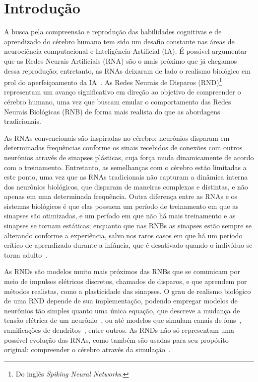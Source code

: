 \chapter{Introdução}

A busca pela compreensão e reprodução das habilidades cognitivas e de aprendizado do cérebro humano tem sido um desafio constante
nas áreas de neurociência computacional e Inteligência Artificial (IA). É possível argumentar que as Redes Neurais Artificiais
(RNA) são o mais próximo que já chegamos dessa reprodução; entretanto, as RNAs deixaram de lado o realismo biológico em prol do
aperfeiçoamento da IA~\cite{yamazakiSpiking2022}. As Redes Neurais de Disparos (RND)\footnote{Do inglês \textit{Spiking Neural
Networks}.} representam um avanço significativo em direção ao objetivo de compreender o cérebro humano, uma vez que buscam emular
o comportamento das Redes Neurais Biológicas (RNB) de forma mais realista do que as abordagens tradicionais.

As RNAs convencionais são inspiradas no cérebro: neurônios disparam em determinadas frequências conforme os sinais recebidos de
conexões com outros neurônios através de sinapses plásticas, cuja força muda dinamicamente de acordo com o treinamento.
Entretanto, as semelhanças com o cérebro estão limitadas a este ponto, uma vez que as RNAs tradicionais não capturam a dinâmica
interna dos neurônios biológicos, que disparam de maneiras complexas e distintas, e não apenas em uma determinada frequência.
Outra diferença entre as RNAs e os sistemas biológicos é que elas possuem um período de treinamento em que as sinapses são
otimizadas, e um período em que não há mais treinamento e as sinapses se tornam estáticas; enquanto que nas RNBs as sinapses estão
sempre se alterando conforme a experiência, salvo nos raros casos em que há um período crítico de aprendizado durante a infância,
que é desativado quando o indivíduo se torna adulto~\cite{crepelRegression1982}.

As RNDs são modelos muito mais próximos das RNBs que se comunicam por meio de impulsos elétricos discretos, chamados de disparos,
e que aprendem por métodos realistas, como a plasticidade das sinapses. O grau de realismo biológico de uma RND depende de sua
implementação, podendo empregar modelos de neurônios tão simples quanto uma única equação, que descreve a mudança de tensão
elétrica de um neurônio~\cite{burkitt2006review}, ou até modelos que simulam canais de íons~\cite{hodgkinQuantitative1952},
ramificações de dendritos~\cite{pagkalosIntroducing2023}, entre outros. As RNDs não só representam uma possível evolução das RNAs,
como também são usadas para seu propósito original: compreender o cérebro através da simulação~\cite{}.


